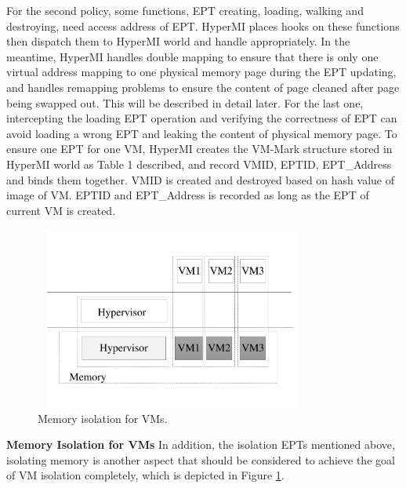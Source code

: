 \documentclass[conference]{IEEEtran}
\begin{document}
For the second policy, some functions, EPT creating, loading, walking and destroying, need access address of EPT. HyperMI places hooks on these functions then dispatch them to HyperMI world and handle appropriately. In the meantime, HyperMI handles double mapping to ensure that there is only one virtual address mapping to one physical memory page during the EPT updating, and handles remapping problems to ensure the content of page cleaned after page being swapped out. This will be described in detail later.
For the last one, intercepting the loading EPT operation and verifying the correctness of EPT can avoid loading a wrong EPT and leaking the content of physical memory page. To ensure one EPT for one VM, HyperMI creates the VM-Mark structure stored in HyperMI world as Table 1 described, and record VMID, EPTID, EPT\_Address and binds them together. VMID is created and destroyed based on hash value of image of VM. EPTID and EPT\_Address is recorded as long as the EPT of current VM is created.
\begin{figure}
\centerline{\includegraphics[width=9cm, height=6cm]{pdfvmcs3.pdf}}%
\caption{Memory isolation for VMs.} \label{fig3}
\end{figure}
\textbf{Memory Isolation for VMs }
In addition, the isolation EPTs mentioned above, isolating memory is another aspect that should be considered to achieve the goal of VM isolation completely, which is depicted in Figure \ref{fig3}. 
\end{document}
